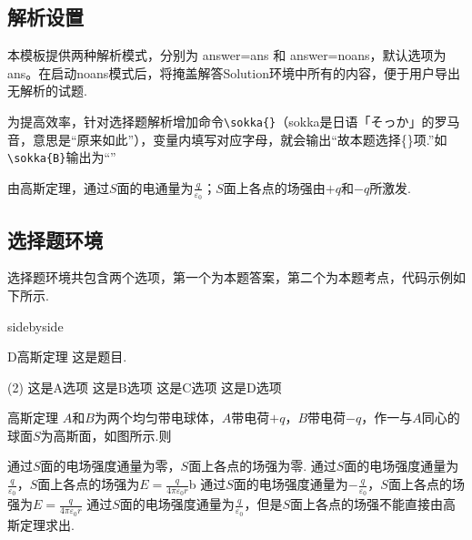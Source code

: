 {\subsection{解析设置}
本模板提供两种解析模式，分别为 answer=ans 和 answer=noans，默认选项为ans。在启动noans模式后，将掩盖解答Solution环境中所有的内容，便于用户导出无解析的试题.

为提高效率，针对选择题解析增加命令\verb|\sokka{}|（sokka是日语「そっか」的罗马音，意思是“原来如此”），变量内填写对应字母，就会输出“故本题选择\{\}项.”如\verb|\sokka{B}|输出为“”
\begin{tcblisting}{}
\begin{solution}
由高斯定理，通过$S$面的电通量为$\frac{q}{\varepsilon_0}$；$S$面上各点的场强由$+q$和$-q$所激发.
\end{solution}
\end{tcblisting}
\subsection{选择题环境}
选择题环境共包含两个选项，第一个为本题答案，第二个为本题考点，代码示例如下所示.
\begin{tcblisting}{sidebyside}
    \begin{choice}{D}{高斯定理}
        这是题目.
        \begin{tasks}(2)%
            \task 这是A选项
            \task 这是B选项
            \task 这是C选项
            \task 这是D选项
        \end{tasks}
    \end{choice}
\end{tcblisting}

\begin{paracol}{2}
    \begin{choice}[D]{高斯定理}
        $A$和$B$为两个均匀带电球体，$A$带电荷$+q$，$B$带电荷$-q$，作一与$A$同心的球面$S$为高斯面，如图所示.则
        \begin{tasks}
            \task 通过$S$面的电场强度通量为零，$S$面上各点的场强为零.
            \task 通过$S$面的电场强度通量为$\frac{q}{\varepsilon_0}$，$S$面上各点的场强为$E=\frac{q}{4\pi\varepsilon_0r}$b
            \task 通过$S$面的电场强度通量为$-\frac{q}{\varepsilon_0}$，$S$面上各点的场强为$E=\frac{q}{4\pi\varepsilon_0r}$
            \task 通过$S$面的电场强度通量为$\frac{q}{\varepsilon_0}$，但是$S$面上各点的场强不能直接由高斯定理求出.
        \end{tasks}
    \end{choice}
    \switchcolumn
    \centering\vfill
    \vfill
\end{paracol}

}
